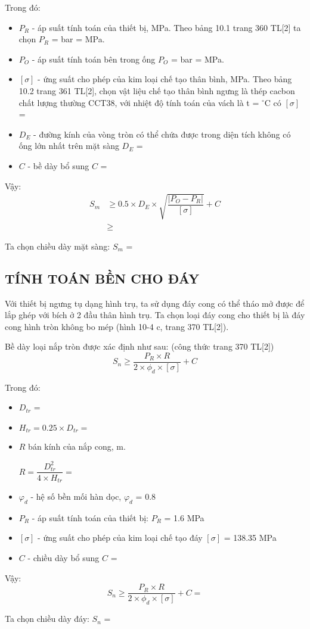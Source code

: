 Trong đó:
\begin{itemize}
	\item $P_{R}$ - áp suất tính toán của thiết bị, MPa. Theo bảng 10.1 trang 360 TL[2] ta chọn $P_{R}$ =  bar =  MPa.
	\item $P_{O}$ - áp suất tính toán bên trong ống $P_{O}$ =  bar =  MPa.
	\item $[\sigma]$ - ứng suất cho phép của kim loại chế tạo thân bình, MPa. Theo bảng 10.2 trang 361 TL[2], chọn vật liệu chế tạo thân bình ngưng là thép cacbon chất lượng thường CCT38, với nhiệt độ tính toán của vách là t = $^{\circ}$C có $[\sigma]$ = 	
	\item $D_{E}$ - đường kính của vòng tròn có thể chứa được trong diện tích không có ống lớn nhất trên mặt sàng $D_{E}$ = 
	\item $C$ - bề dày bổ sung $C$ = 
\end{itemize}

Vậy:
\begin{equation*}
\begin{split}
		S_{m} &\geq 0.5\times D_{E}\times \sqrt{\dfrac{|P_{O} - P_{R}|}{[\sigma]}} + C\\
		&\geq 
\end{split}
\end{equation*}

Ta chọn chiều dày mặt sàng: $S_{m}$ = 

\subsection{TÍNH TOÁN BỀN CHO ĐÁY}
Với thiết bị ngưng tụ dạng hình trụ, ta sử dụng đáy cong có thể tháo mở được để lắp ghép với bích ở 2 đầu thân hình trụ. Ta chọn loại đáy cong cho thiết bị là đáy cong hình tròn không bo mép (hình 10-4 c, trang 370 TL[2]).

Bề dày loại nắp tròn được xác định như sau: (công thức trang 370 TL[2])
\begin{equation*}
	S_{n} \geq \dfrac{P_{R}\times R}{2\times \phi_{d}\times[\sigma]} + C
\end{equation*}

Trong đó:
\begin{itemize}
	\item $D_{tr}$ = 
	\item $H_{tr} = 0.25\times D_{tr} = $
	\item $R$ bán kính của nắp cong, m.
	
	$R = \dfrac{D_{tr}^2}{4\times H_{tr}} = $ 
	\item $ \varphi_{d} $ - hệ số bền mối hàn dọc, $\varphi_{d}$ = 0.8
	\item $P_{R}$ - áp suất tính toán của thiết bị: $P_{R}$ = 1.6 MPa
	\item $[\sigma]$ - ứng suất cho phép của kim loại chế tạo đáy $[\sigma]$ = 138.35 MPa 
	\item $C$ - chiều dày bổ sung $C$ = 
\end{itemize}

Vậy: 
\begin{equation*}
	S_{n} \geq \dfrac{P_{R}\times R}{2\times \phi_{d}\times[\sigma]} + C = 
\end{equation*}

Ta chọn chiều dày đáy: $S_{n}$ = 
